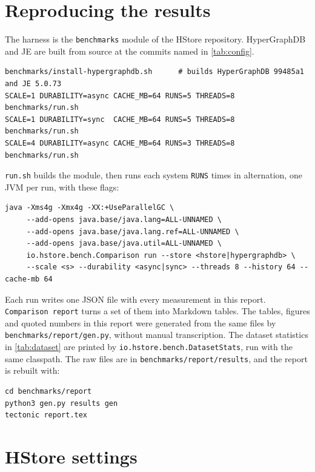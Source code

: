 \clearpage
\section{Reproducing the results}
\label{app:repro}

The harness is the \texttt{benchmarks} module of the HStore repository. HyperGraphDB and JE are built from source at the commits named in \cref{tab:config}.

\begin{verbatim}
benchmarks/install-hypergraphdb.sh      # builds HyperGraphDB 99485a1 and JE 5.0.73
SCALE=1 DURABILITY=async CACHE_MB=64 RUNS=5 THREADS=8 benchmarks/run.sh
SCALE=1 DURABILITY=sync  CACHE_MB=64 RUNS=5 THREADS=8 benchmarks/run.sh
SCALE=4 DURABILITY=async CACHE_MB=64 RUNS=3 THREADS=8 benchmarks/run.sh
\end{verbatim}

\texttt{run.sh} builds the module, then runs each system \texttt{RUNS} times in alternation, one JVM per run, with these flags:

\begin{verbatim}
java -Xms4g -Xmx4g -XX:+UseParallelGC \
     --add-opens java.base/java.lang=ALL-UNNAMED \
     --add-opens java.base/java.lang.ref=ALL-UNNAMED \
     --add-opens java.base/java.util=ALL-UNNAMED \
     io.hstore.bench.Comparison run --store <hstore|hypergraphdb> \
     --scale <s> --durability <async|sync> --threads 8 --history 64 --cache-mb 64
\end{verbatim}

Each run writes one JSON file with every measurement in this report. \texttt{Comparison report} turns a set of them into Markdown tables. The tables, figures and quoted numbers in this report were generated from the same files by \texttt{benchmarks/report/gen.py}, without manual transcription. The dataset statistics in \cref{tab:dataset} are printed by \texttt{io.hstore.bench.DatasetStats}, run with the same classpath. The raw files are in \texttt{benchmarks/report/results}, and the report is rebuilt with:

\begin{verbatim}
cd benchmarks/report
python3 gen.py results gen
tectonic report.tex
\end{verbatim}

\section{HStore settings}
\label{app:settings}

